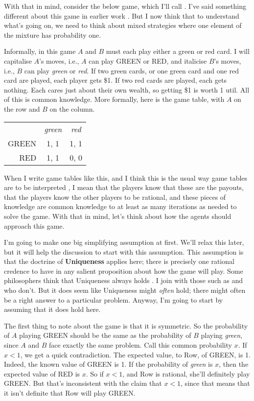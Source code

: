With that in mind, consider the below game, which I'll call \RG. I've said something different about this game in earlier work \citep{Weatherson2012-WEAGAT}. But I now think that to understand what's going on, we need to think about mixed strategies where one element of the mixture has probability one.

Informally, in this game $A$ and $B$ must each play either a green or red card. I will capitalise $A$'s moves, i.e., $A$ can play GREEN or RED, and italicise $B$'s moves, i.e., $B$ can play \textit{green} or \textit{red}. If two green cards, or one green card and one red card are played, each player gets \$1. If two red cards are played, each gets nothing. Each cares just about their own wealth, so getting \$1 is worth 1 util. All of this is common knowledge. More formally, here is the game table, with $A$ on the row and $B$ on the column.

\begin{center}
\begin{tabular}{r c c}
 & \textit{green} & \textit{red} \\
GREEN & 1, 1 & 1, 1 \\
RED & 1, 1 & 0, 0
\end{tabular}
\end{center}
When I write game tables like this, and I think this is the usual way game tables are to be interpreted \citep{Weatherson2012-WEAKBI}, I mean that the players know that these are the payouts, that the players know the other players to be rational, and these pieces of knowledge are common knowledge to at least as many iterations as needed to solve the game. With that in mind, let's think about how the agents should approach this game.

I'm going to make one big simplifying assumption at first. We'll relax this later, but it will help the discussion to start with this assumption. This assumption is that the doctrine of \textbf{Uniqueness} applies here; there is precisely one rational credence to have in any salient proposition about how the game will play. Some philosophers think that Uniqueness always holds \citep{White2005-WHIEP}. I join with those such as \cite{North2010} and \cite{Schoenfield2013} who don't. But  it does seem like Uniqueness might \textit{often} hold; there might often be a right answer to a particular problem. Anyway, I'm going to start by assuming that it does hold here.

The first thing to note about the game is that it is symmetric. So the probability of $A$ playing GREEN should be the same as the probability of $B$ playing \textit{green}, since $A$ and $B$ face exactly the same problem. Call this common probability $x$. If $x < 1$, we get a quick contradiction. The expected value, to Row, of GREEN, is 1. Indeed, the known value of GREEN is 1. If the probability of \textit{green} is $x$, then the expected value of RED is $x$. So if $x < 1$, and Row is rational, she'll definitely play GREEN. But that's inconsistent with the claim that $x < 1$, since that means that it isn't definite that Row will play GREEN.

